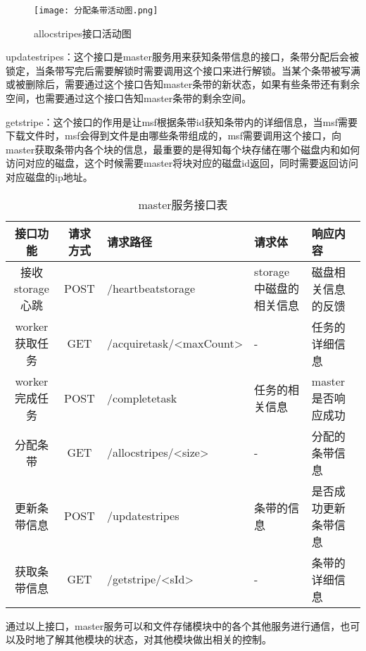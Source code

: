 \begin{figure}
  \centering
  \texttt{[image: 分配条带活动图.png]}
  \caption{allocstripes接口活动图}
\end{figure}

updatestripes：这个接口是master服务用来获知条带信息的接口，条带分配后会被锁定，当条带写完后需要解锁时需要调用这个接口来进行解锁。当某个条带被写满或被删除后，需要通过这个接口告知master条带的新状态，如果有些条带还有剩余空间，也需要通过这个接口告知master条带的剩余空间。

getstripe：这个接口的作用是让msf根据条带id获知条带内的详细信息，当msf需要下载文件时，msf会得到文件是由哪些条带组成的，msf需要调用这个接口，向master获取条带内各个块的信息，最重要的是得知每个块存储在哪个磁盘内和如何访问对应的磁盘，这个时候需要master将块对应的磁盘id返回，同时需要返回访问对应磁盘的ip地址。


\begin{table}[h]
  \centering
  \caption{master服务接口表}
  \begin{tabular}{ccp{2.5cm}p{2cm}p{3cm}}
    \toprule
    接口功能   & 请求方式    & 请求路径     & 请求体    & 响应内容                     \\
    \midrule
    接收storage心跳       & POST  & /heartbeatstorage                & storage中磁盘的相关信息   & 磁盘相关信息的反馈\\
    worker获取任务        & GET   & /acquiretask\newline/<maxCount>  & -                        & 任务的详细信息\\
    worker完成任务        & POST  & /completetask                    & 任务的相关信息            & master是否响应成功\\
    分配条带              & GET   & /allocstripes\newline/<size>     & -                        & 分配的条带信息\\
    更新条带信息          & POST  & /updatestripes                   & 条带的信息                & 是否成功更新条带信息\\
    获取条带信息          & GET   & /getstripe\newline/<sId>    & -                        & 条带的详细信息\\
    \bottomrule
  \end{tabular}
\end{table}	

通过以上接口，master服务可以和文件存储模块中的各个其他服务进行通信，也可以及时地了解其他模块的状态，对其他模块做出相关的控制。

